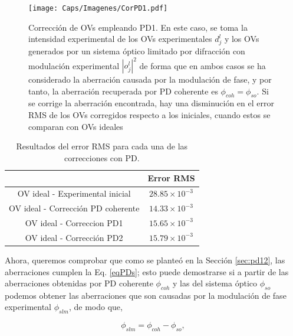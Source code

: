 \begin{figure}[!ht]
  \centering
    \texttt{[image: Caps/Imagenes/CorPD1.pdf]}
  \caption[Corrección de OVs empleando PD1.]{Corrección de OVs empleando PD1. En este caso, se toma la intensidad experimental de los OVs experimentales $d_j^l$ y los OVs generados por un sistema óptico limitado por difracción con modulación experimental $|o_j^l|^2$ de forma que en ambos casos se ha considerado la aberración causada por la modulación de fase, y por tanto, la aberración recuperada por PD coherente es $\phi_{coh} = \phi_{so}$. Si se corrige la aberración encontrada, hay una disminución en el error RMS de los OVs corregidos respecto a los iniciales, cuando estos se comparan con OVs ideales}
  \label{fig:corpd1}
\end{figure}

\begin{table}[!ht]
\centering
\begin{tabular}{|c|c|}
\hline 
  & Error RMS \\ 
\hline 
OV ideal - Experimental inicial & $28.85\times 10^{-3}$ \\ 
\hline 
OV ideal - Corrección PD coherente & $14.33\times 10^{-3}$ \\ 
\hline 
OV ideal - Correccion PD1 & $15.65\times 10^{-3}$ \\ 
\hline 
OV ideal - Corrección PD2 & $15.79\times 10^{-3}$ \\ 
\hline 
\end{tabular} 
\caption{Resultados del error RMS para cada una de las correcciones con PD.}
\label{tab:corpd}
\end{table}

Ahora, queremos comprobar que como se planteó en la Sección \ref{sec:pd12}, las aberraciones cumplen la Eq. \ref{eqPDs}; esto puede demostrarse si a partir de las aberraciones obtenidas por PD coherente $\phi_{coh}$ y las del sistema óptico $\phi_{so}$ podemos obtener las aberraciones que son causadas por la modulación de fase experimental $\phi_{slm}$, de modo que,

\begin{equation}
\label{eqR1}
\phi_{slm} = \phi_{coh}-\phi_{so},
\end{equation}

